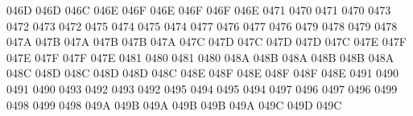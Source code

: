\setcclcucx 046D 046D 046C %
\setcclcucx 046E 046F 046E %
\setcclcucx 046F 046F 046E %
 0471 0470 %
 0471 0470 %
 0473 0472 %
 0473 0472 %
 0475 0474 %
 0475 0474 %
 0477 0476 %
 0477 0476 %
 0479 0478 %
 0479 0478 %
\setcclcucx 047A 047B 047A %
\setcclcucx 047B 047B 047A %
\setcclcucx 047C 047D 047C %
\setcclcucx 047D 047D 047C %
\setcclcucx 047E 047F 047E %
\setcclcucx 047F 047F 047E %
 0481 0480 %
 0481 0480 %
\setcclcucx 048A 048B 048A %
\setcclcucx 048B 048B 048A %
\setcclcucx 048C 048D 048C %
\setcclcucx 048D 048D 048C %
\setcclcucx 048E 048F 048E %
\setcclcucx 048F 048F 048E %
 0491 0490 %
 0491 0490 %
 0493 0492 %
 0493 0492 %
 0495 0494 %
 0495 0494 %
 0497 0496 %
 0497 0496 %
 0499 0498 %
 0499 0498 %
\setcclcucx 049A 049B 049A %
\setcclcucx 049B 049B 049A %
\setcclcucx 049C 049D 049C %
